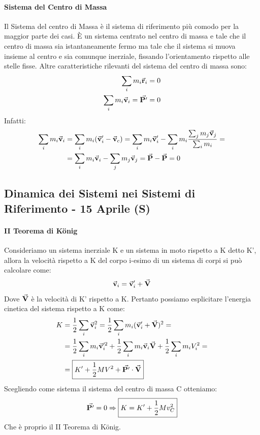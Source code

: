 \documentclass{article}
\newcommand{\then}{\ensuremath{\Rightarrow}}
\renewcommand{\v}{\va{v}}
\renewcommand{\r}{\va{r}}
\begin{document}
\paragraph{Sistema del Centro di Massa}
Il Sistema del centro di Massa è il sistema di riferimento più comodo per la maggior parte dei casi. È un sistema centrato nel centro di massa e tale che il centro di massa sia istantaneamente fermo ma tale che il sistema si muova insieme al centro e sia comunque inerziale, fissando l'orientamento rispetto alle stelle fisse. Altre caratteristiche rilevanti del sistema del centro di massa sono:
\begin{align*}
    \sum_im_i\r_i=0\\
    \sum_im_i\v_i=\va{P'}=0
\end{align*}
Infatti:
\begin{equation}
\begin{split}
    \sum_im_i\v_i&=\sum_im_i(\v_i'-\v_c)=\sum_im_i\v_i'-\sum_im_i\frac{\sum_jm_j\v_j}{\sum_im_i}=\\
    &=\sum_im_i\v_i-\sum_jm_j\v_j=\va{P}-\va{P}=0
\end{split}
\end{equation}

\subsection{Dinamica dei Sistemi nei Sistemi di Riferimento - 15 Aprile (S)}
\paragraph{II Teorema di König}
Consideriamo un sistema inerziale K e un sistema in moto rispetto a K detto K', allora la velocità rispetto a K del corpo i-esimo di un sistema di corpi si può calcolare come:
\[\v_i=\v_i'+\va{V}\]
Dove $\va{V}$ è la velocità di K' rispetto a K. Pertanto possiamo esplicitare l'energia cinetica del sistema rispetto a K come:
\begin{equation}
\begin{split}
    K&=\frac{1}{2}\sum_i\v_i^2=\frac{1}{2}\sum_im_i(\v_i'+\va{V})^2=\\
    &=\frac{1}{2}\sum_im_i\v_i'^2+\frac{1}{2}\sum_im_i\v_i\va{V}+\frac{1}{2}\sum_im_iV_i^2=\\
    &=\boxed{K'+\frac{1}{2}MV^2+\va{P'}\cdot\va{V}}
\end{split}    
\end{equation}
Scegliendo come sistema il sistema del centro di massa C otteniamo:
\begin{equation}
    \va{P'}=0\then \boxed{K=K'+\frac{1}{2}Mv_C^2}
\end{equation}
Che è proprio il II Teorema di König.
\end{document}
